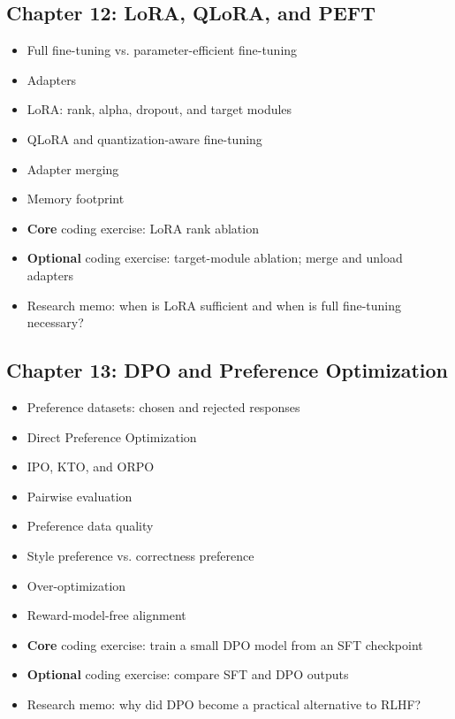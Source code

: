 \documentclass[11pt]{article}
\begin{document}
\subsection{Chapter 12: LoRA, QLoRA, and PEFT}

\begin{itemize}
    \item Full fine-tuning vs. parameter-efficient fine-tuning
    \item Adapters
    \item LoRA: rank, alpha, dropout, and target modules
    \item QLoRA and quantization-aware fine-tuning
    \item Adapter merging
    \item Memory footprint
    \item \textbf{Core} coding exercise: LoRA rank ablation
    \item \textbf{Optional} coding exercise: target-module ablation; merge and unload adapters
    \item Research memo: when is LoRA sufficient and when is full fine-tuning necessary?
\end{itemize}

\subsection{Chapter 13: DPO and Preference Optimization}

\begin{itemize}
    \item Preference datasets: chosen and rejected responses
    \item Direct Preference Optimization
    \item IPO, KTO, and ORPO
    \item Pairwise evaluation
    \item Preference data quality
    \item Style preference vs. correctness preference
    \item Over-optimization
    \item Reward-model-free alignment
    \item \textbf{Core} coding exercise: train a small DPO model from an SFT checkpoint
    \item \textbf{Optional} coding exercise: compare SFT and DPO outputs
    \item Research memo: why did DPO become a practical alternative to RLHF?
\end{itemize}
\end{document}
